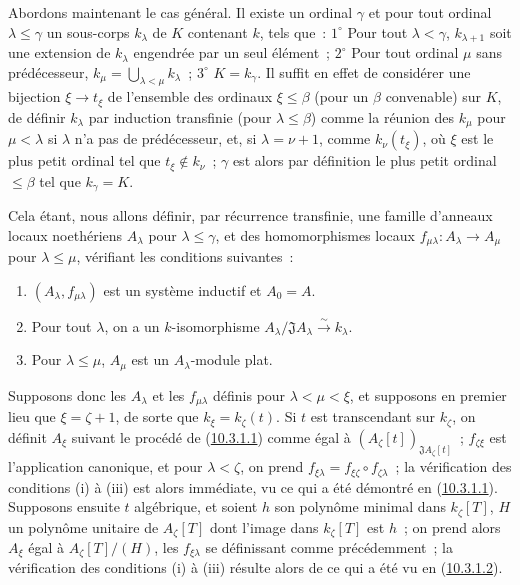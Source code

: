 \begin{env}[10.3.1.4]
\label{0.10.3.1.4-fr}
Abordons maintenant le cas général. Il existe un ordinal $\gamma$ et pour
tout ordinal $\lambda\leq\gamma$ un sous-corps $k_\lambda$ de $K$ contenant
$k$, tels que~: $1^\circ$ Pour tout $\lambda<\gamma$, $k_{\lambda+1}$ soit
une extension de $k_\lambda$ engendrée par un seul élément~; $2^\circ$ Pour
tout ordinal $\mu$ sans prédécesseur,
$k_\mu=\bigcup_{\lambda<\mu}k_\lambda$~; $3^\circ$ $K=k_\gamma$. Il suffit en
effet de considérer une bijection $\xi\to t_\xi$ de l'ensemble des
ordinaux $\xi\leq\beta$ (pour un $\beta$ convenable) sur $K$, de définir
$k_\lambda$ par induction transfinie (pour $\lambda\leq\beta$) comme la
réunion des $k_\mu$ pour $\mu<\lambda$ si $\lambda$ n'a pas de prédécesseur,
et, si $\lambda=\nu+1$, comme $k_\nu(t_\xi)$, où $\xi$ est le plus petit
ordinal tel que $t_\xi\notin k_\nu$~; $\gamma$ est alors par définition le plus
petit ordinal $\leq\beta$ tel que $k_\gamma=K$.

Cela étant, nous allons définir, par récurrence transfinie, une famille
d'anneaux locaux noethériens $A_\lambda$ pour $\lambda\leq\gamma$, et des
homomorphismes locaux $f_{\mu\lambda}:A_\lambda\to A_\mu$ pour
$\lambda\leq\mu$, vérifiant les conditions suivantes~:
\begin{enumerate}
  \item[(i)] $(A_\lambda,f_{\mu\lambda})$ est un système inductif et $A_0=A$.
  \item[(ii)] Pour tout $\lambda$, on a un $k$-isomorphisme
    $A_\lambda/\mathfrak J A_\lambda\xrightarrow{\sim}k_\lambda$.
  \item[(iii)] Pour $\lambda\leq\mu$, $A_\mu$ est un $A_\lambda$-module plat.
\end{enumerate}

Supposons donc les $A_\lambda$ et les $f_{\mu\lambda}$ définis pour
$\lambda<\mu<\xi$, et supposons en premier lieu que $\xi=\zeta+1$, de sorte
que $k_\xi=k_\zeta(t)$. Si $t$ est transcendant sur $k_\zeta$, on définit
$A_\xi$ suivant le procédé de (\hyperref[0.10.3.1.1-fr]{10.3.1.1}) comme
égal à $(A_\zeta[t])_{\mathfrak J A_\zeta[t]}$~;
$f_{\zeta\xi}$ est l'application canonique, et pour $\lambda<\zeta$, on prend
$f_{\xi\lambda}=f_{\xi\zeta}\circ f_{\zeta\lambda}$~; la vérification des
conditions (i) à (iii) est alors immédiate, vu ce qui a été démontré en
(\hyperref[0.10.3.1.1-fr]{10.3.1.1}). Supposons ensuite $t$ algébrique, et
soient $h$ son polynôme minimal dans $k_\zeta[T]$, $H$ un polynôme unitaire de
$A_\zeta[T]$ dont l'image dans $k_\zeta[T]$ est $h$~; on prend alors $A_\xi$
égal à $A_\zeta[T]/(H)$, les $f_{\xi\lambda}$ se définissant comme
précédemment~; la vérification des conditions (i) à (iii) résulte alors de
ce qui a été vu en (\hyperref[0.10.3.1.2-fr]{10.3.1.2}).


\end{env}
